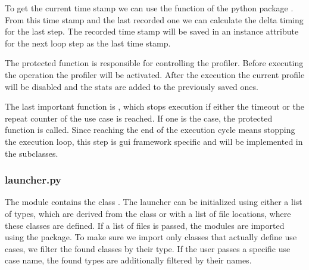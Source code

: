 

To get the current time stamp we can use the 
function of the python package . From this time stamp
and the last recorded one we can calculate the delta timing for the last step.
The recorded time stamp will be saved in an instance attribute for the next loop
step as the last time stamp.



The protected function  is responsible for
controlling the profiler. Before executing the operation the profiler will be
activated. After the execution the current profile will be disabled and the
stats are added to the previously saved ones.



The last important function is 
, which stops execution if either the timeout or the repeat counter of
the use case is reached. If one is the case, the protected function
 is called. Since reaching the end of the
execution cycle means stopping the execution loop, this step is \gls{gui}
framework specific and will be implemented in the subclasses. 



\subsubsection*{launcher.py}

The module  contains the class
. The launcher can be initialized using either a
list of types, which are derived from the  class or
with a list of file locations, where these classes are defined. If a list of
files is passed, the modules are imported using the
 package. To make sure we import only classes that
actually define use cases, we filter the found classes by their type. If the
user passes a specific use case name, the found types are additionally filtered
by their names.

